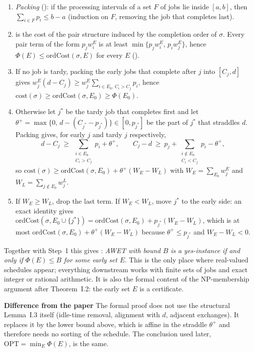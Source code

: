 \documentclass[11pt]{article}
\newcommand{\notelabel}[1]{{\sffamily\bfseries\small\color{noterule}#1}\quad}
\begin{document}
\begin{enumerate}[leftmargin=20pt,label=(\roman*)]
\item \emph{Packing} (): if the processing intervals of a set $F$ of jobs lie
  inside $[a,b]$, then $\sum_{i\in F}p_i\le b-a$ (induction on $F$, removing the job that
  completes last).
\item {} is the cost of the pair structure induced by the completion order of
  $\sigma$. Every pair term of the form $p_jw^E_i$ is at least
  $\min\{p_jw^E_i,\,p_iw^E_j\}$, hence $\Phi(E)\le\mathrm{ordCost}(\sigma,E)$ for every $E$
  ().
\item If no job is tardy, packing the early jobs that complete after $j$ into $[C_j,d]$ gives
  $w^E_j(d-C_j)\ge w^E_j\sum_{i\in E_0,\,C_i>C_j}p_i$, hence
  $\mathrm{cost}(\sigma)\ge\mathrm{ordCost}(\sigma,E_0)\ge\Phi(E_0)$.
\item Otherwise let $j^\ast$ be the tardy job that completes first and let
  $\theta^+=\max\{0,\,d-(C_{j^\ast}-p_{j^\ast})\}\in[0,p_{j^\ast}]$ be the part of $j^\ast$ that
  straddles $d$. Packing gives, for early $j$ and tardy $j$ respectively,
  \[
  d-C_j\ \ge\ \sum_{\substack{i\in E_0\\ C_i>C_j}}p_i+\theta^+,\qquad
  C_j-d\ \ge\ p_j+\sum_{\substack{i\notin E_0\\ C_i<C_j}}p_i-\theta^+ ,
  \]
  so $\mathrm{cost}(\sigma)\ge\mathrm{ordCost}(\sigma,E_0)+\theta^+(W_E-W_L)$ with
  $W_E=\sum_{E_0}w^E_j$ and $W_L=\sum_{j\notin E_0}w^L_j$.
\item If $W_E\ge W_L$, drop the last term. If $W_E<W_L$, move $j^\ast$ to the early side: an exact
  identity gives
  $\mathrm{ordCost}(\sigma,E_0\cup\{j^\ast\})=\mathrm{ordCost}(\sigma,E_0)+p_{j^\ast}(W_E-W_L)$,
  which is at most $\mathrm{ordCost}(\sigma,E_0)+\theta^+(W_E-W_L)$ because
  $\theta^+\le p_{j^\ast}$ and $W_E-W_L<0$.
\end{enumerate}
Together with Step~1 this gives : \emph{AWET with bound $B$ is a yes-instance if and
only if $\Phi(E)\le B$ for some early set $E$}. This is the only place where real-valued
schedules appear; everything downstream works with finite sets of jobs and exact integer or
rational arithmetic. It is also the formal content of the NP-membership argument after
Theorem~I.2: the early set $E$ is a certificate.

\begin{notebox}
\notelabel{Difference from the paper}
The formal proof does not use the structural Lemma~I.3 itself (idle-time removal, alignment
with $d$, adjacent exchanges). It replaces it by the lower bound above, which is affine in the
straddle $\theta^+$ and therefore needs no sorting of the schedule. The conclusion used later,
$\mathrm{OPT}=\min_E\Phi(E)$, is the same.
\end{notebox}
\end{document}
